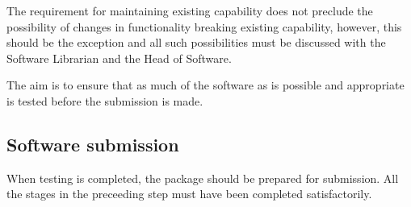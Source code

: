 \begin{description}
\begin{enumerate}
The requirement for maintaining existing capability does not preclude
the possibility of changes in functionality breaking existing
capability, however, this should be the exception and all such
possibilities must be discussed with the Software Librarian and the
Head of Software.

\end{enumerate}

The aim is to ensure that as much of the software as is possible and
appropriate is tested before the submission is made.

\end{description}

\subsection{\label{software_submission}Software submission}

When testing is completed, the package should be prepared for
submission.  All the stages in the preceeding step must have been
completed satisfactorily.


